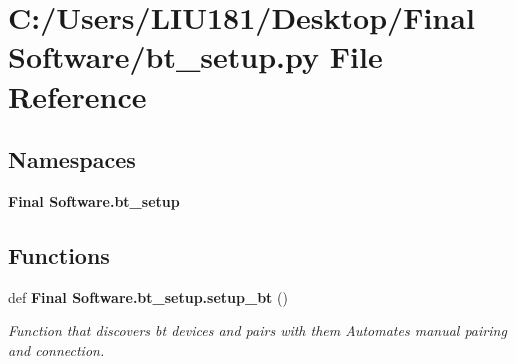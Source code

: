 \section{C\+:/\+Users/\+L\+I\+U181/\+Desktop/\+Final Software/bt\+\_\+setup.py File Reference}
\label{bt__setup_8py}
\subsection*{Namespaces}
\begin{DoxyCompactItemize}
\item 
 \textbf{ Final Software.\+bt\+\_\+setup}
\end{DoxyCompactItemize}
\subsection*{Functions}
\begin{DoxyCompactItemize}
\item 
def \textbf{ Final Software.\+bt\+\_\+setup.\+setup\+\_\+bt} ()
\begin{DoxyCompactList}\small\item\em Function that discovers bt devices and pairs with them Automates manual pairing and connection. \end{DoxyCompactList}\end{DoxyCompactItemize}
